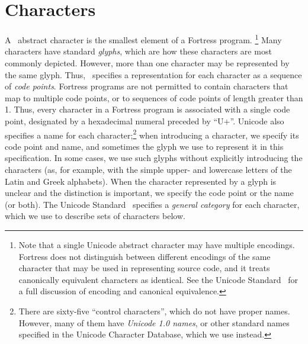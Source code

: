 \section{Characters}

A \unicode\ abstract character is the smallest element
of a Fortress program.
\footnote{Note that
a single Unicode abstract character may have multiple encodings.
Fortress does not distinguish between different encodings
of the same character that may be used in representing source code,
and it treats canonically equivalent characters as identical.
See the Unicode Standard~\cite{Unicode} for a full discussion
of encoding and canonical equivalence.}
Many characters have standard \emph{glyphs},
which are how these characters are most commonly depicted.
However,
more than one character may be represented by the same glyph.
Thus,
\unicode\ specifies a representation for each character
as a sequence of \emph{code points}.
Fortress programs are not permitted to contain characters
that map to multiple code points, or to sequences of code
points of length greater than 1.
Thus, every character in a Fortress program is associated with a
single code point,
designated by a hexadecimal numeral preceded by ``U+''.
Unicode also specifies a name for each character;\footnote{There are
sixty-five ``control characters'',
which do not have proper names.
However, many of them have \emph{Unicode 1.0 names},
or other standard names specified in the Unicode Character Database,
which we use instead.}
when introducing a character,
we specify its code point and name,
and sometimes the glyph we use to represent it in this specification.
In some cases,
we use such glyphs without explicitly introducing the characters
(as, for example, with the simple upper- and lowercase letters
of the Latin and Greek alphabets).
When the character represented by a glyph is unclear
and the distinction is important,
we specify the code point or the name (or both).
The Unicode Standard~\cite{Unicode} specifies
a \emph{general category} for each character,
which we use to describe sets of characters below.

